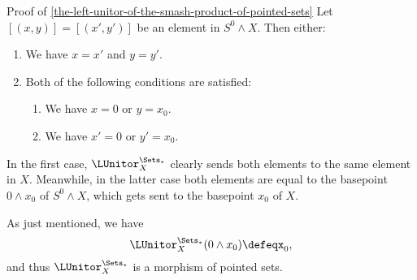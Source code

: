 \begin{Proof}{Proof of \cref{the-left-unitor-of-the-smash-product-of-pointed-sets}}%
    Let $[(x,y)]=[(x',y')]$ be an element in $S^{0}\wedge X$. Then either:
    \begin{enumerate}
        \item We have $x=x'$ and $y=y'$.
        \item Both of the following conditions are satisfied:
            \begin{enumerate}
                \item We have $x=0$ or $y=x_{0}$.
                \item We have $x'=0$ or $y'=x_{0}$.
            \end{enumerate}
    \end{enumerate}
    In the first case, $\LUnitor^{\Sets_{*}}_{X}$ clearly sends both elements to the same element in $X$. Meanwhile, in the latter case both elements are equal to the basepoint $0\wedge x_{0}$ of $S^{0}\wedge X$, which gets sent to the basepoint $x_{0}$ of $X$.

    As just mentioned, we have
    \[
        \LUnitor^{\Sets_{*}}_{X}(0\wedge x_{0})%
        \defeq%
        x_{0},%
    \]%
    and thus $\LUnitor^{\Sets_{*}}_{X}$ is a morphism of pointed sets.


\end{Proof}
